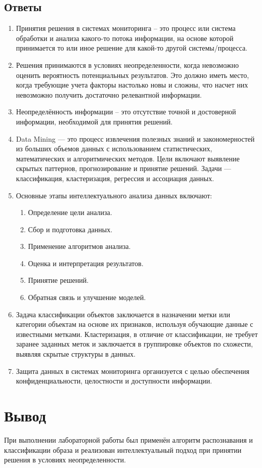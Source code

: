 \documentclass[a4paper, 12pt]{article}
\begin{document}
\subsection*{Ответы}
\begin{enumerate}
  \item Принятия решения в системах мониторинга – это процесс или система
  обработки и анализа какого-то потока информации, на основе которой
  принимается то или иное решение для какой-то другой системы/процесса.
  \item Решения принимаются в условиях неопределенности, когда невозможно
  оценить вероятность потенциальных результатов. Это должно иметь место,
  когда требующие учета факторы настолько новы и сложны, что насчет них
  невозможно получить достаточно релевантной информации.
  \item Неопределённость информации – это отсутствие точной и достоверной
  информации, необходимой для принятия решений.
  \item Data Mining — это процесс извлечения полезных знаний и закономерностей из больших объемов данных с использованием статистических, математических и алгоритмических методов. Цели включают выявление скрытых паттернов, прогнозирование и принятие решений. Задачи — классификация, кластеризация, регрессия и ассоциация данных.
  \item Основные этапы интеллектуального анализа данных включают:
    \begin{enumerate}
      \item Определение цели анализа.
      \item Сбор и подготовка данных.
      \item Применение алгоритмов анализа.
      \item Оценка и интерпретация результатов.
      \item Принятие решений.
      \item Обратная связь и улучшение моделей.
    \end{enumerate}
  \item Задача классификации объектов заключается в назначении метки или категории объектам на основе их признаков, используя обучающие данные с известными метками. Кластеризация, в отличие от классификации, не требует заранее заданных меток и заключается в группировке объектов по схожести, выявляя скрытые структуры в данных.
  \item Защита данных в системах мониторинга организуется с целью обеспечения конфиденциальности, целостности и доступности информации.
\end{enumerate}
\newpage
\section{Вывод}
При выполнении лабораторной работы был применён алгоритм распознавания и классификации образа и реализован интеллектуальный подход при принятии решения в условиях неопределенности.
\end{document}

